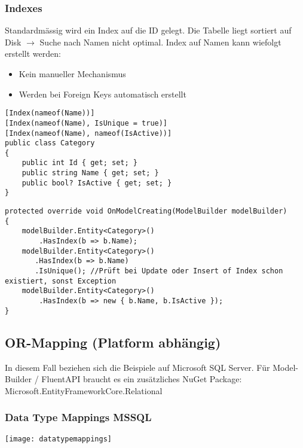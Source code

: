 \begin{multicols*}{2}
\subsubsection{Indexes}
Standardmässig wird ein Index auf die ID gelegt. Die Tabelle liegt sortiert auf Disk $\rightarrow$ Suche nach Namen nicht optimal.
Index auf Namen kann wiefolgt erstellt werden:
\begin{itemize}
    \item Kein manueller Mechanismus
    \item Werden bei Foreign Keys automatisch erstellt
\end{itemize}
\begin{lstlisting}
[Index(nameof(Name))] 
[Index(nameof(Name), IsUnique = true)] 
[Index(nameof(Name), nameof(IsActive))] 
public class Category
{
    public int Id { get; set; }
    public string Name { get; set; } 
    public bool? IsActive { get; set; }
}
\end{lstlisting}
\begin{lstlisting}
protected override void OnModelCreating(ModelBuilder modelBuilder)
{
    modelBuilder.Entity<Category>()
        .HasIndex(b => b.Name);
    modelBuilder.Entity<Category>()
       .HasIndex(b => b.Name)
       .IsUnique(); //Prüft bei Update oder Insert of Index schon existiert, sonst Exception
    modelBuilder.Entity<Category>()
        .HasIndex(b => new { b.Name, b.IsActive });
}
\end{lstlisting}

\subsection{OR-Mapping (Platform abhängig)}
In diesem Fall beziehen sich die Beispiele auf Microsoft SQL Server. 
Für Model-Builder / FluentAPI braucht es ein zusätzliches NuGet Package: Microsoft.EntityFrameworkCore.Relational
\subsubsection{Data Type Mappings MSSQL}
\texttt{[image: datatypemappings]}

\end{multicols*}
